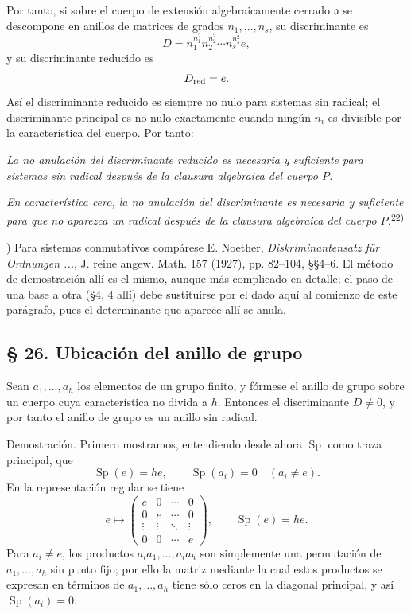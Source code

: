 \documentclass[11pt]{article}
\providecommand{\mo}{\mathfrak{o}}
\begin{document}
Por tanto, si sobre el cuerpo de extensión algebraicamente cerrado $\mo$ se descompone en anillos de matrices de grados $n_1,\ldots,n_s$, su discriminante es
\[
        D=n_1^{n_1^2}n_2^{n_2^2}\cdots n_s^{n_s^2}e,
\]
y su discriminante reducido es
\[
        D_{\rm red}=e.
\]
Así el discriminante reducido es siempre no nulo para sistemas sin radical; el discriminante principal es no nulo exactamente cuando ningún $n_i$ es divisible por la característica del cuerpo. Por tanto:

\emph{La no anulación del discriminante reducido es necesaria y suficiente para sistemas sin radical después de la clausura algebraica del cuerpo $P$.}

\emph{En característica cero, la no anulación del discriminante es necesaria y suficiente para que no aparezca un radical después de la clausura algebraica del cuerpo $P$.}\textsuperscript{22)}

{\footnotesize{}) Para sistemas conmutativos compárese E. Noether, \emph{Diskriminantensatz für Ordnungen ...}, J. reine angew. Math. 157 (1927), pp. 82--104, §§4--6. El método de demostración allí es el mismo, aunque más complicado en detalle; el paso de una base a otra (§4, 4 allí) debe sustituirse por el dado aquí al comienzo de este parágrafo, pues el determinante que aparece allí se anula.\par}

\subsection*{§ 26. Ubicación del anillo de grupo}

Sean $a_1,\ldots,a_h$ los elementos de un grupo finito, y fórmese el anillo de grupo sobre un cuerpo cuya característica no divida a $h$. Entonces el discriminante $D\ne0$, y por tanto el anillo de grupo es un anillo sin radical.

Demostración. Primero mostramos, entendiendo desde ahora $\operatorname{Sp}$ como traza principal, que
\[
        \operatorname{Sp}(e)=he,
        \qquad
        \operatorname{Sp}(a_i)=0\quad (a_i\ne e).
\]
En la representación regular se tiene
\[
        e\mapsto\begin{pmatrix}e&0&\cdots&0\\0&e&\cdots&0\\\vdots&\vdots&\ddots&\vdots\\0&0&\cdots&e\end{pmatrix},
        \qquad \operatorname{Sp}(e)=he.
\]
Para $a_i\ne e$, los productos $a_i a_1,\ldots,a_i a_h$ son simplemente una permutación de $a_1,\ldots,a_h$ sin punto fijo; por ello la matriz mediante la cual estos productos se expresan en términos de $a_1,\ldots,a_h$ tiene sólo ceros en la diagonal principal, y así $\operatorname{Sp}(a_i)=0$.
\end{document}
